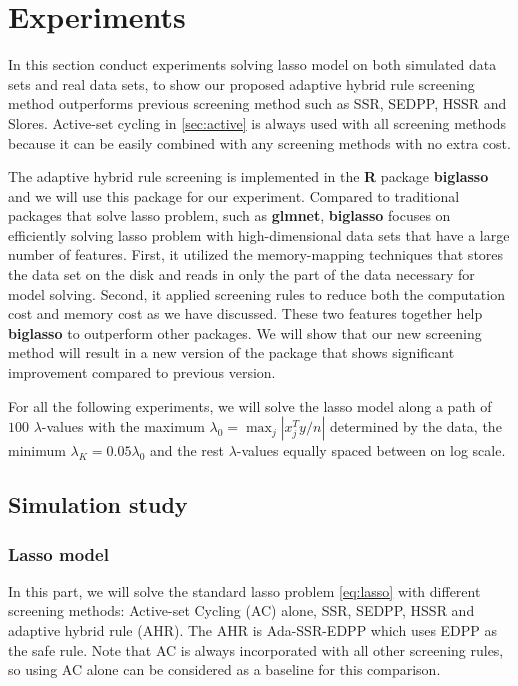 \section{Experiments}
\label{sec:5}

In this section conduct experiments solving lasso model on both simulated data sets and real data sets, to show our proposed adaptive hybrid rule screening method outperforms previous screening method such as SSR, SEDPP, HSSR and Slores. Active-set cycling in \ref{sec:active} is always used with all screening methods because it can be easily combined with any screening methods with no extra cost.

The adaptive hybrid rule screening is implemented in the \textbf{R} package \textbf{biglasso} and we will use this package for our experiment. Compared to traditional packages that solve lasso problem, such as \textbf{glmnet}, \textbf{biglasso} focuses on efficiently solving lasso problem with high-dimensional data sets that have a large number of features. First, it utilized the memory-mapping techniques that stores the data set on the disk and reads in only the part of the data necessary for model solving. Second, it applied screening rules to reduce both the computation cost and memory cost as we have discussed. These two features together help \textbf{biglasso} to outperform other packages. We will show that our new screening method will result in a new version of the package that shows significant improvement compared to previous version. 

For all the following experiments, we will solve the lasso model along a path of $100$ $\lambda$-values with the maximum $\lambda_0=\max_j|x_j^Ty/n|$ determined by the data, the minimum $\lambda_K=0.05\lambda_0$ and the rest $\lambda$-values equally spaced between on log scale.

\subsection{Simulation study}
\label{sec:sim}

\subsubsection{Lasso model}

In this part, we will solve the standard lasso problem \eqref{eq:lasso} with different screening methods: Active-set Cycling (AC) alone, SSR, SEDPP, HSSR and adaptive hybrid rule (AHR). The AHR is Ada-SSR-EDPP which uses EDPP as the safe rule. Note that AC is always incorporated with all other screening rules, so using AC alone can be considered as a baseline for this comparison.

